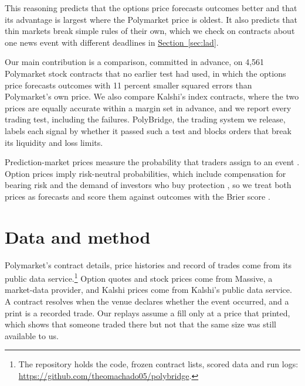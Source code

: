 \documentclass[11pt]{article}
\newcommand{\lref}[2]{\hyperref[#2]{#1~\ref*{#2}}}
\begin{document}
This reasoning predicts that the options price forecasts outcomes better and that its advantage is largest where the Polymarket price is oldest. It also predicts that thin markets break simple rules of their own, which we check on contracts about one news event with different deadlines in \lref{Section}{sec:lad}.

Our main contribution is a comparison, committed in advance, on 4,561 Polymarket stock contracts that no earlier test had used, in which the options price forecasts outcomes with 11 percent smaller squared errors than Polymarket's own price. We also compare Kalshi's index contracts, where the two prices are equally accurate within a margin set in advance, and we report every trading test, including the failures. PolyBridge, the trading system we release, labels each signal by whether it passed such a test and blocks orders that break its liquidity and loss limits.

Prediction-market prices measure the probability that traders assign to an event \citep{wolfers2004}. Option prices imply risk-neutral probabilities, which include compensation for bearing risk \citep{breeden1978} and the demand of investors who buy protection \citep{garleanu2009}, so we treat both prices as forecasts and score them against outcomes with the Brier score \citep{brier1950}.

\section{Data and method}\label{sec:data}
Polymarket's contract details, price histories and record of trades come from its public data service.\footnote{The repository holds the code, frozen contract lists, scored data and run logs: \url{https://github.com/theomachado05/polybridge}.} Option quotes and stock prices come from Massive, a market-data provider, and Kalshi prices come from Kalshi's public data service. A contract resolves when the venue declares whether the event occurred, and a print is a recorded trade. Our replays assume a fill only at a price that printed, which shows that someone traded there but not that the same size was still available to us.
\end{document}
